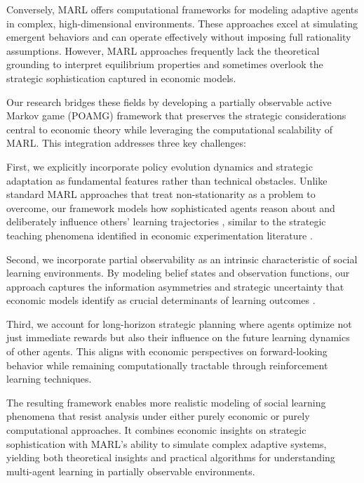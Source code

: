 Conversely, MARL offers computational frameworks for modeling adaptive agents in complex, high-dimensional environments. These approaches excel at simulating emergent behaviors and can operate effectively without imposing full rationality assumptions. However, MARL approaches frequently lack the theoretical grounding to interpret equilibrium properties and sometimes overlook the strategic sophistication captured in economic models.

Our research bridges these fields by developing a partially observable active Markov game (POAMG) framework that preserves the strategic considerations central to economic theory while leveraging the computational scalability of MARL. This integration addresses three key challenges:

First, we explicitly incorporate policy evolution dynamics and strategic adaptation as fundamental features rather than technical obstacles. Unlike standard MARL approaches that treat non-stationarity as a problem to overcome, our framework models how sophisticated agents reason about and deliberately influence others' learning trajectories \citep{kim2022influencing}, similar to the strategic teaching phenomena identified in economic experimentation literature \citep{yamamoto2019stochastic}.

Second, we incorporate partial observability as an intrinsic characteristic of social learning environments. By modeling belief states and observation functions, our approach captures the information asymmetries and strategic uncertainty that economic models identify as crucial determinants of learning outcomes \citep{heidhues2015strategic, rosenberg2009informational}.

Third, we account for long-horizon strategic planning where agents optimize not just immediate rewards but also their influence on the future learning dynamics of other agents. This aligns with economic perspectives on forward-looking behavior while remaining computationally tractable through reinforcement learning techniques.

The resulting framework enables more realistic modeling of social learning phenomena that resist analysis under either purely economic or purely computational approaches. It combines economic insights on strategic sophistication with MARL's ability to simulate complex adaptive systems, yielding both theoretical insights and practical algorithms for understanding multi-agent learning in partially observable environments.
